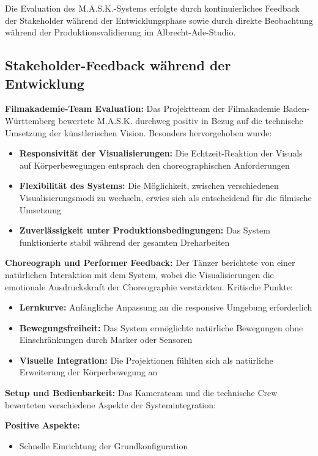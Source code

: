 Die Evaluation des M.A.S.K.-Systems erfolgte durch kontinuierliches Feedback der Stakeholder während der Entwicklungsphase sowie durch direkte Beobachtung während der Produktionsvalidierung im Albrecht-Ade-Studio.

\subsection{Stakeholder-Feedback während der Entwicklung}

\textbf{Filmakademie-Team Evaluation:}
Das Projektteam der Filmakademie Baden-Württemberg bewertete M.A.S.K. durchweg positiv in Bezug auf die technische Umsetzung der künstlerischen Vision. Besonders hervorgehoben wurde:

\begin{itemize}
    \item \textbf{Responsivität der Visualisierungen:} Die Echtzeit-Reaktion der Visuals auf Körperbewegungen entsprach den choreographischen Anforderungen
    \item \textbf{Flexibilität des Systems:} Die Möglichkeit, zwischen verschiedenen Visualisierungsmodi zu wechseln, erwies sich als entscheidend für die filmische Umsetzung
    \item \textbf{Zuverlässigkeit unter Produktionsbedingungen:} Das System funktionierte stabil während der gesamten Dreharbeiten
\end{itemize}

\textbf{Choreograph und Performer Feedback:}
Der Tänzer berichtete von einer natürlichen Interaktion mit dem System, wobei die Visualisierungen die emotionale Ausdruckskraft der Choreographie verstärkten. Kritische Punkte:

\begin{itemize}
    \item \textbf{Lernkurve:} Anfängliche Anpassung an die responsive Umgebung erforderlich
    \item \textbf{Bewegungsfreiheit:} Das System ermöglichte natürliche Bewegungen ohne Einschränkungen durch Marker oder Sensoren
    \item \textbf{Visuelle Integration:} Die Projektionen fühlten sich als natürliche Erweiterung der Körperbewegung an
\end{itemize}

\textbf{Setup und Bedienbarkeit:}
Das Kamerateam und die technische Crew bewerteten verschiedene Aspekte der Systemintegration:

\textbf{Positive Aspekte:}
\begin{itemize}
    \item Schnelle Einrichtung der Grundkonfiguration
\end{itemize}

